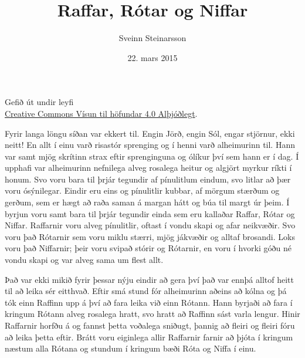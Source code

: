 \documentclass[ebook,11pt,oneside,openany]{memoir}
\title{Raffar, Rótar og Niffar}
\date{22. mars 2015}
\author{Sveinn Steinarsson}
\begin{document}
\maketitle
\thispagestyle{empty}

\vfill
\begin{center}
{\footnotesize
Gefið út undir leyfi
\\\href{http://creativecommons.org/licenses/by/4.0/}{Creative Commons Vísun til höfundar 4.0 Alþjóðlegt}.
}
\end{center}

\newpage

\setcounter{page}{1}

Fyrir langa löngu síðan var ekkert til. Engin Jörð, engin Sól, engar stjörnur, ekki neitt! En allt í einu varð risastór sprenging og í henni varð alheimurinn til. Hann var samt mjög skrítinn strax eftir sprenginguna og ólíkur því sem hann er í dag. Í upphafi var alheimurinn nefnilega alveg rosalega heitur og algjört myrkur ríkti í honum. Svo voru bara til þrjár tegundir af pínulitlum eindum, svo litlar að þær voru ósýnilegar. Eindir eru eins og pínulitlir kubbar, af mörgum stærðum og gerðum, sem er hægt að raða saman á margan hátt og búa til margt úr þeim. Í byrjun voru samt bara til þrjár tegundir einda sem eru kallaðar Raffar, Rótar og Niffar. Raffarnir voru alveg pínulitlir, oftast í vondu skapi og afar neikvæðir. Svo voru það Rótarnir sem voru miklu stærri, mjög jákvæðir og alltaf brosandi. Loks voru það Niffarnir; þeir voru svipað stórir og Rótarnir, en voru í hvorki góðu né vondu skapi og var alveg sama um flest allt.

Það var ekki mikið fyrir þessar nýju eindir að gera því það var ennþá alltof heitt til að leika sér eitthvað. Eftir smá stund fór alheimurinn aðeins að kólna og þá tók einn Raffinn upp á því að fara leika við einn Rótann. Hann byrjaði að fara í kringum Rótann alveg rosalega hratt, svo hratt að Raffinn sást varla lengur. Hinir Raffarnir horfðu á og fannst þetta voðalega sniðugt, þannig að fleiri og fleiri fóru að leika þetta eftir. Brátt voru eiginlega allir Raffarnir farnir að þjóta í kringum næstum alla Rótana og stundum í kringum bæði Róta og Niffa í einu.
\end{document}

